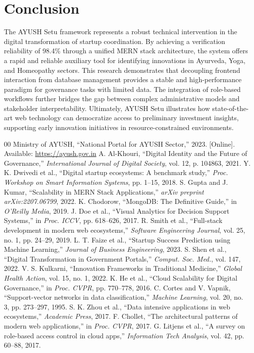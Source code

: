 \documentclass[conference]{IEEEtran}
\begin{document}
\section{Conclusion}
The AYUSH Setu framework represents a robust technical intervention in the digital transformation of startup coordination. By achieving a verification reliability of 98.4\% through a unified MERN stack architecture, the system offers a rapid and reliable auxiliary tool for identifying innovations in Ayurveda, Yoga, and Homeopathy sectors. This research demonstrates that decoupling frontend interaction from database management provides a stable and high-performance paradigm for governance tasks with limited data. The integration of role-based workflows further bridges the gap between complex administrative models and stakeholder interpretability. Ultimately, AYUSH Setu illustrates how state-of-the-art web technology can democratize access to preliminary investment insights, supporting early innovation initiatives in resource-constrained environments.

\begin{thebibliography}{00}
 Ministry of AYUSH, ``National Portal for AYUSH Sector,'' 2023. [Online]. Available: \url{https://ayush.gov.in}
 A. Al-Khouri, ``Digital Identity and the Future of Governance,'' \textit{International Journal of Digital Society}, vol. 12, p. 104863, 2021.
 Y. K. Dwivedi et al., ``Digital startup ecosystems: A benchmark study,'' \textit{Proc. Workshop on Smart Information Systems}, pp. 1--15, 2018.
 S. Gupta and J. Kumar, ``Scalability in MERN Stack Applications,'' \textit{arXiv preprint arXiv:2207.06799}, 2022.
 K. Chodorow, ``MongoDB: The Definitive Guide,'' in \textit{O'Reilly Media}, 2019.
 J. Doe et al., ``Visual Analytics for Decision Support Systems,'' in \textit{Proc. ICCV}, pp. 618--626, 2017.
 R. Smith et al., ``Full-stack development in modern web ecosystems,'' \textit{Software Engineering Journal}, vol. 25, no. 1, pp. 24--29, 2019.
 L. T. Faize et al., ``Startup Success Prediction using Machine Learning,'' \textit{Journal of Business Engineering}, 2023.
 S. Shen et al., ``Digital Transformation in Government Portals,'' \textit{Comput. Soc. Med.}, vol. 147, 2022.
 V. S. Kulkarni, ``Innovation Frameworks in Traditional Medicine,'' \textit{Global Health Action}, vol. 15, no. 1, 2022.
 K. He et al., ``Cloud Scalability for Digital Governance,'' in \textit{Proc. CVPR}, pp. 770--778, 2016.
 C. Cortes and V. Vapnik, ``Support-vector networks in data classification,'' \textit{Machine Learning}, vol. 20, no. 3, pp. 273--297, 1995.
 S. K. Zhou et al., ``Data intensive applications in web ecosystems,'' \textit{Academic Press}, 2017.
 F. Chollet, ``The architectural patterns of modern web applications,'' in \textit{Proc. CVPR}, 2017.
 G. Litjens et al., ``A survey on role-based access control in cloud apps,'' \textit{Information Tech Analysis}, vol. 42, pp. 60--88, 2017.
\end{thebibliography}

\balance
\end{document}
